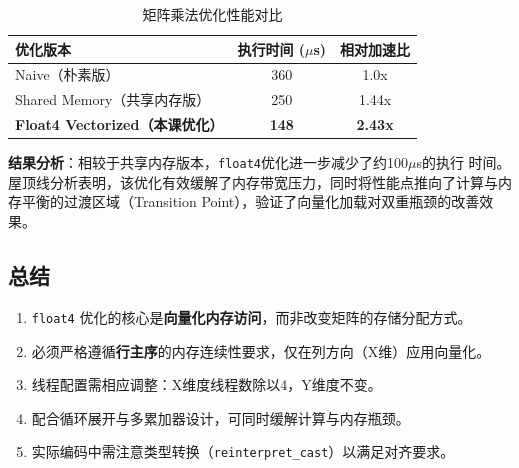 \begin{table}[h!]
\centering
\caption{矩阵乘法优化性能对比}
\begin{tabular}{lcc}
\toprule
\textbf{优化版本} & \textbf{执行时间 ($\mu$s)} & \textbf{相对加速比} \\
\midrule
Naive（朴素版） & 360 & 1.0x \\Shared Memory（共享内存版） & 250 & 1.44x \\
\textbf{Float4 Vectorized（本课优化）} & \textbf{148} & \textbf{2.43x} \\
\bottomrule
\end{tabular}
\end{table}

\textbf{结果分析}：相较于共享内存版本，\texttt{float4}优化进一步减少了约100$\mu$s的执行
时间。屋顶线分析表明，该优化有效缓解了内存带宽压力，同时将性能点推向了计算与内存平衡的过渡区域（Transition Point），验证了向量化加载对双重瓶颈的改善效果。


\subsection{总结}
\begin{enumerate}
    \item \texttt{float4} 优化的核心是\textbf{向量化内存访问}，而非改变矩阵的存储分配方式。
    \item 必须严格遵循\textbf{行主序}的内存连续性要求，仅在列方向（X维）应用向量化。
    \item 线程配置需相应调整：X维度线程数除以4，Y维度不变。
    \item 配合循环展开与多累加器设计，可同时缓解计算与内存瓶颈。
    \item 实际编码中需注意类型转换（\texttt{reinterpret\_cast}）以满足对齐要求。
\end{enumerate}

